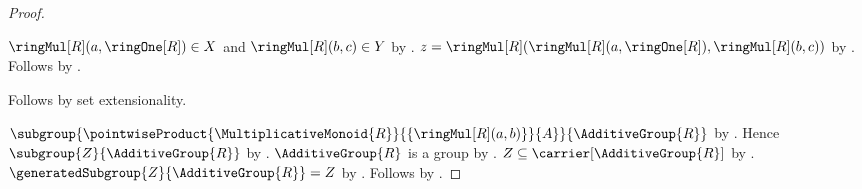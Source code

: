 \begin{proof}
\begin{subproof}
\begin{subproof}
            $\ringMul[R](a,\ringOne[R])\in X$ and
                $\ringMul[R](b,c)\in Y$ by
                .
            $z=\ringMul[R](
                \ringMul[R](a,\ringOne[R]),\ringMul[R](b,c))$ by
                .
            Follows by .
        \end{subproof}
        Follows by set extensionality.
    \end{subproof}
    $\subgroup{
        \pointwiseProduct{\MultiplicativeMonoid{R}}{
            \{\ringMul[R](a,b)\}}{A}}{\AdditiveGroup{R}}$ by
        .
    Hence $\subgroup{Z}{\AdditiveGroup{R}}$ by \auto.
    $\AdditiveGroup{R}$ is a group by .
    $Z\subseteq\carrier[\AdditiveGroup{R}]$ by
        .
    $\generatedSubgroup{Z}{\AdditiveGroup{R}}=Z$ by
        .
    Follows by .
\end{proof}

